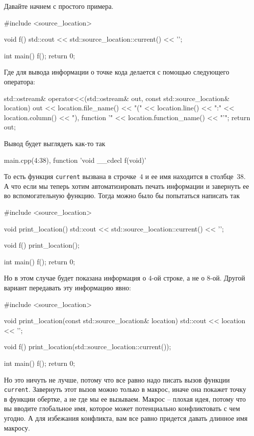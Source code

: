 Давайте начнем с простого примера.
\begin{cppcode}
#include <source_location>

void f() {
  std::cout << std::source_location::current() << '\n';
}

int main() {
  f();
  return 0;
}
\end{cppcode}
Где для вывода информации о точке кода делается с помощью следующего оператора:
\begin{cppcode}
std::ostream& operator<<(std::ostream& out, const std::source_location& location) {
  out << location.file_name() << "(" << location.line() << ":"
      << location.column() << "), function '" << location.function_name()
      << "'";
  return out;
}
\end{cppcode}
Вывод будет выглядеть как-то так
\begin{cppcode}
main.cpp(4:38), function 'void __cdecl f(void)'
\end{cppcode}
То есть функция \verb"current" вызвана в строчке~$4$ и ее имя находится в столбце~$38$.
А что если мы теперь хотим автоматизировать печать информации и завернуть ее во вспомогательную функцию.
Тогда можно было бы попытаться написать так
\begin{cppcode}
#include <source_location>

void print_location() {
  std::cout << std::source_location::current() << '\n';
}

void f() {
  print_location();
}

int main() {
  f();
  return 0;
}
\end{cppcode}
Но в этом случае будет показана информация о $4$-ой строке, а не о $8$-ой.
Другой вариант передавать эту информацию явно:
\begin{cppcode}
#include <source_location>

void print_location(const  std::source_location& location) {
  std::cout << location << '\n';
}

void f() {
  print_location(std::source_location::current());
}

int main() {
  f();
  return 0;
}
\end{cppcode}
Но это ничуть не лучше, потому что все равно надо писать вызов функции \verb"current".
Завернуть этот вызов можно только в макрос, иначе она покажет точку в функции обертке, а не где мы ее вызываем.
Макрос -- плохая идея, потому что вы вводите глобальное имя, которое может потенциально конфликтовать с чем угодно.
А для избежания конфликта, вам все равно придется давать длинное имя макросу.
